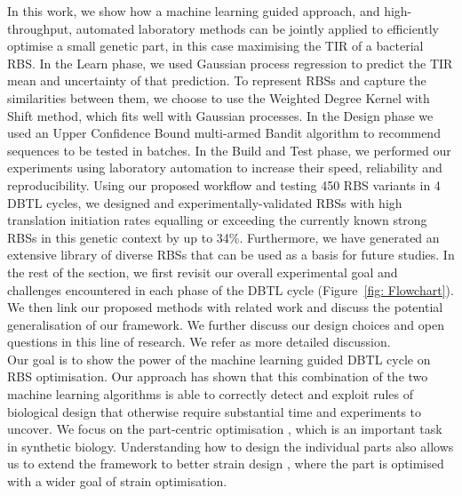 \documentclass{scrartcl}[2013/05/29]%
\begin{document}
In this work, we show how a machine learning guided approach, and high-throughput, automated laboratory methods can be jointly applied to efficiently optimise a small genetic part, in this case maximising the TIR of a bacterial RBS.
In the Learn phase, we used Gaussian process regression to predict the TIR mean and uncertainty of that prediction.
To represent RBSs and capture the similarities between them, we choose to use
the Weighted Degree Kernel with Shift method, which fits well with Gaussian processes.
In the Design phase we used an Upper Confidence Bound multi-armed Bandit algorithm to recommend sequences to be tested in batches.
In the Build and Test phase, we performed our experiments using laboratory
automation to increase their speed, reliability and reproducibility.
Using our proposed workflow and testing 450 RBS variants in 4 DBTL cycles,
we designed and experimentally-validated RBSs with high translation initiation rates equalling or exceeding the currently known strong RBSs in this genetic context by up to 34\%.
Furthermore, we have generated an extensive library of diverse RBSs that can be used as a basis for future studies.
In the rest of the section, we first revisit our overall experimental goal and challenges encountered in each phase of the
DBTL cycle (Figure~\ref{fig: Flowchart}).
We then link our proposed methods with related work and discuss the potential generalisation of our framework.
We further discuss our design choices and open questions in this line of research.
We refer \cite{zhang_synbio2021} as more detailed discussion.\\ 

Our goal is to show the power of the machine learning guided DBTL cycle on RBS optimisation.
Our approach has shown that this combination of the two machine learning algorithms is able to correctly detect and exploit rules of biological design that otherwise require substantial time and experiments to uncover.
We focus on the part-centric optimisation \cite{Hollerer2020}, which is an important task in synthetic biology. 
Understanding how to design the individual parts also allows us to extend the framework to better strain design \cite{Jervis2019}, where the part is optimised with a wider goal of strain optimisation.
\\
\end{document}
